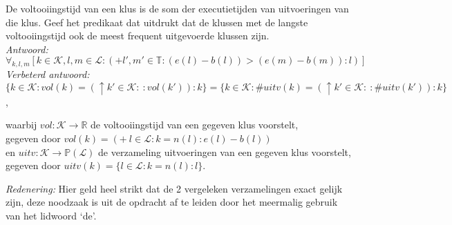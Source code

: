 
\item De voltooiingstijd van een klus is de som der executietijden van uitvoeringen van die klus. Geef het predikaat dat uitdrukt dat de klussen met de langste voltooiingstijd ook de meest frequent uitgevoerde klussen zijn. \\



\emph{Antwoord:} $\forall_{k,l,m} [k\in{\mathcal{K},l,m\in{\mathcal{L}}} : (+ l',m'\in{\mathbb{T}} : (e(l)-b(l))>(e(m)-b(m)) : l)]$ \\

\emph{Verbeterd antwoord:} $\{k \in \mathcal{K} : vol(k) = (\uparrow k' \in \mathcal{K} :~:
vol(k')) : k \} = \{ k \in \mathcal{K} : \#uitv(k) = (\uparrow k' \in \mathcal{K} :~: \#uitv(k')) :
k \}$,

waarbij $vol : \mathcal{K} \rightarrow \mathbb{R}$ de voltooiingstijd van een gegeven klus voorstelt, \\
gegeven door $vol(k) = (+~ l \in \mathcal{L} : k = n(l) : e(l) - b(l))$ \\
en $uitv : \mathcal{K} \rightarrow \mathbb{P}(\mathcal{L})$ de verzameling uitvoeringen van een gegeven klus voorstelt, \\
gegeven door $uitv(k) = \{l \in \mathcal{L} : k = n(l) : l \}$.

\emph{Redenering:} Hier geld heel strikt dat de 2 vergeleken verzamelingen exact gelijk zijn, deze noodzaak is uit de opdracht af te leiden door het meermalig gebruik van het lidwoord `de'. \\
